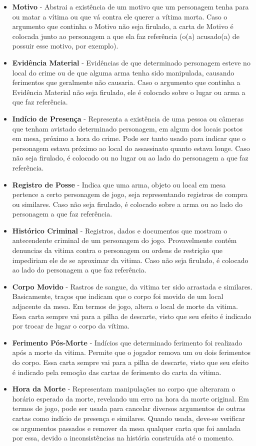 \documentclass[a4paper, 11pt]{article}
\begin{document}
		\begin{itemize}
			\item \textbf{Motivo} - Abstrai a existência de um motivo que um personagem tenha para ou matar a vítima ou que vá contra ele querer a vítima morta. Caso o argumento que continha o Motivo não seja firulado, a carta de Motivo é colocada junto ao personagem a que ela faz referência (o(a) acusado(a) de possuir esse motivo, por exemplo).
			\item \textbf{Evidência Material} -  Evidências de que determinado personagem esteve no local do crime ou de que alguma arma tenha sido manipulada, causando ferimentos que geralmente não causaria. Caso o argumento que continha a Evidência Material não seja firulado, ele é colocado sobre o lugar ou arma a que faz referência.
			\item \textbf{Indício de Presença} - Representa a existência de uma pessoa ou câmeras que tenham avistado determinado personagem, em algum dos locais postos em mesa, próximo a hora do crime. Pode ser tanto usado para indicar que o personagem estava próximo ao local do assassinato quanto estava longe. Caso não seja firulado, é colocado ou no lugar ou ao lado do personagem a que faz referência.
			\item \textbf{Registro de Posse} - Indica que uma arma, objeto ou local em mesa pertence a certo personagem de jogo, seja representando registros de compra ou similares. Caso não seja firulado, é colocado sobre a arma ou ao lado do personagem a que faz referência.
			\item \textbf{Histórico Criminal} - Registros, dados e documentos que mostram o antecendente criminal de um personagem do jogo. Provavelmente contém denuncias da vitima contra o personagem ou ordens de restrição que impediriam ele de se aproximar da vitima. Caso não seja firulado, é colocado ao lado do personagem a que faz referência.
			\item \textbf{Corpo Movido} - Rastros de sangue, da vitima ter sido arrastada e similares. Basicamente, traços que indicam que o corpo foi movido de um local adjacente da mesa. Em termos de jogo, altera o local de morte da vitima. Essa carta sempre vai para a pilha de descarte, visto que seu efeito é indicado por trocar de lugar o corpo da vítima.
			\item \textbf{Ferimento Pós-Morte} - Indícios que determinado ferimento foi realizado após a morte da vitima. Permite que o jogador remova um ou dois ferimentos do corpo. Essa carta sempre vai para a pilha de descarte, visto que seu efeito é indicado pela remoção das cartas de ferimento do carta da vítima.
			\item \textbf{Hora da Morte} - Representam manipulações no corpo que alteraram o horário esperado da morte, revelando um erro na hora da morte original. Em termos de jogo, pode ser usada para cancelar diversos argumentos de outras cartas como indício de presença e similares. Quando usada, deve-se verificar os argumentos passados e remover da mesa qualquer carta que foi anulada por essa, devido a inconsistências na história construída até o momento.
		\end{itemize}
\end{document}
